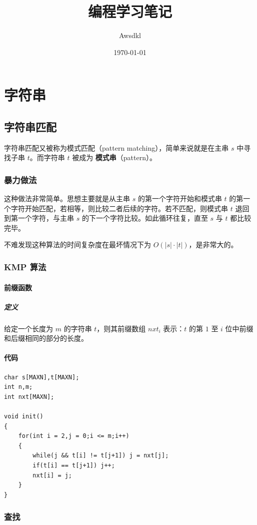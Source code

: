 \documentclass[11pt,oneside,a4paper,UTF8]{book}
\title{编程学习笔记}
\author{Awsdkl}
\date{\today}
\begin{document}
	\maketitle
	\tableofcontents
	\part{字符串}
	\chapter{字符串匹配}
	字符串匹配又被称为模式匹配（pattern matching），简单来说就是在主串 $s$ 中寻找子串 $t$。而字符串 $t$ 被成为 \textbf{模式串}（pattern）。 \par
	\section{暴力做法}
	这种做法非常简单。思想主要就是从主串 $s$ 的第一个字符开始和模式串 $t$ 的第一个字符开始匹配，若相等，则比较二者后续的字符。若不匹配，则模式串 $t$ 退回到第一个字符，与主串 $s$ 的下一个字符比较。如此循环往复，直至 $s$ 与 $t$ 都比较完毕。\par
	不难发现这种算法的时间复杂度在最坏情况下为 $O(|s|\cdot|t|)$，是非常大的。
	\section{KMP 算法}
	
	\subsection{前缀函数}
	\subsubsection{定义}
	给定一个长度为 $m$ 的字符串 $t$，则其前缀数组 $nxt_i$ 表示：$t$ 的第 $1$ 至 $i$ 位中前缀和后缀相同的部分的长度。
	\subsection{代码}
	\begin{lstlisting}
char s[MAXN],t[MAXN];
int n,m;
int nxt[MAXN];

void init()
{
	for(int i = 2,j = 0;i <= m;i++)
	{
		while(j && t[i] != t[j+1]) j = nxt[j];
		if(t[i] == t[j+1]) j++;
		nxt[i] = j;
	}
}
	\end{lstlisting}
	\section{查找}
\end{document}
